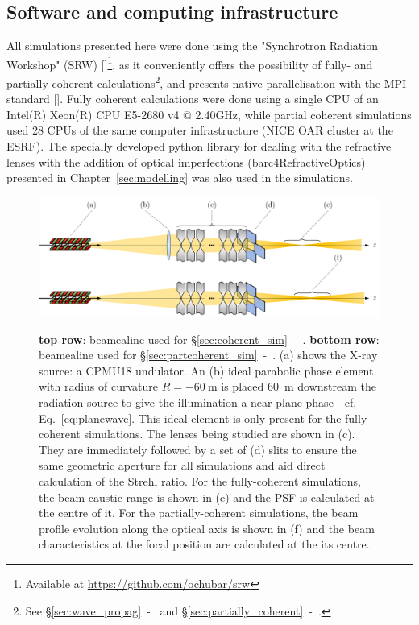 \begin{refsection}
\section{Software and computing infrastructure}\label{sec:SRW}

All simulations presented here were done using the "Synchrotron Radiation Workshop" (SRW) [\cite{Chubar1998}]\footnote{Available at \url{https://github.com/ochubar/srw}}, as it conveniently offers the possibility of fully- and partially-coherent calculations\footnote{See \S\ref{sec:wave_propag}~-~\textit{} and \S\ref{sec:partially_coherent}~-~\textit{}.}, and presents native parallelisation with the MPI standard [\cite{Chubar2011}]. Fully coherent calculations were done using a single CPU of an Intel(R) Xeon(R) CPU E5-2680 v4 @ 2.40GHz, while partial coherent simulations used 28 CPUs of the same computer infrastructure (NICE OAR cluster at the ESRF). The specially developed python library for dealing with the refractive lenses with the addition of optical imperfections (barc4RefractiveOptics) presented in Chapter~\ref{sec:modelling} was also used in the simulations.

\begin{figure}[t]
        \centering
        {\includegraphics[width=0.8\linewidth]{figures/ch05/optical_setups.png}}
        \caption[Beamlines for coherent- and partially-coherent simulations]{\textbf{top row}: beamealine used for  \S\ref{sec:coherent_sim}~-~\textit{}. \textbf{bottom row}: beamealine used for  \S\ref{sec:partcoherent_sim}~-~\textit{}. (a) shows the X-ray source: a CPMU18 undulator. An (b) ideal parabolic phase element with radius of curvature $R=-60~$m is placed 60~m downstream the radiation source to give the illumination a near-plane phase - cf. Eq.~\ref{eq:planewave}. This ideal element is only present for the fully-coherent simulations. The lenses being studied are shown in (c). They are immediately followed by a set of (d) slits to ensure the same geometric aperture for all simulations and aid direct calculation of the Strehl ratio. For the fully-coherent simulations, the beam-caustic range is shown in (e) and the PSF is calculated at the centre of it. For the partially-coherent simulations, the beam profile evolution along the optical axis is shown in (f) and the beam characteristics at the focal position are calculated at the its centre. 
        }\label{fig:optical_setups}
\end{figure}


\end{refsection}
